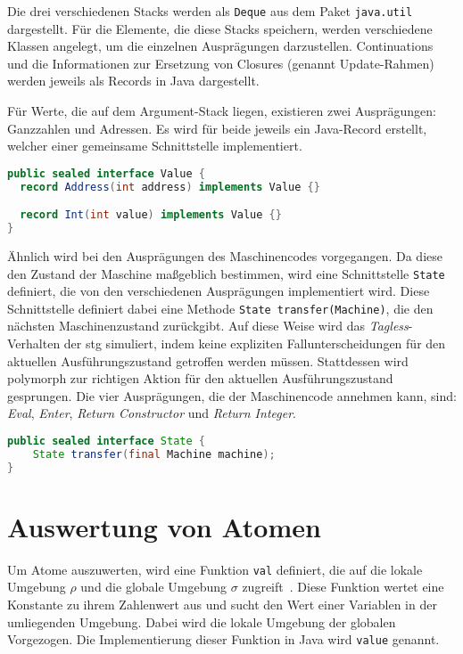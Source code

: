 Die drei verschiedenen Stacks werden als \texttt{Deque} aus dem Paket \texttt{java.util} dargestellt.
Für die Elemente, die diese Stacks speichern, werden verschiedene Klassen angelegt, um die einzelnen Ausprägungen darzustellen.
Continuations und die Informationen zur Ersetzung von Closures (genannt Update-Rahmen) werden jeweils als Records in Java dargestellt.

Für Werte, die auf dem Argument-Stack liegen, existieren zwei Ausprägungen: Ganzzahlen und Adressen.
Es wird für beide jeweils ein Java-Record erstellt, welcher einer gemeinsame Schnittstelle implementiert.

\begin{lstlisting}[language=java, morekeywords={record, sealed}, caption={Darstellung von Werten in Java}, label={lst:value}]
public sealed interface Value {
  record Address(int address) implements Value {}

  record Int(int value) implements Value {}
}
\end{lstlisting}

Ähnlich wird bei den Ausprägungen des Maschinencodes vorgegangen.
Da diese den Zustand der Maschine maßgeblich bestimmen, wird eine Schnittstelle \texttt{State} definiert, die von den verschiedenen Ausprägungen implementiert wird.
Diese Schnittstelle definiert dabei eine Methode \texttt{State transfer(Machine)}, die den nächsten Maschinenzustand zurückgibt.
Auf diese Weise wird das \textit{Tagless}-Verhalten der \gls{stg} simuliert, indem keine expliziten Fallunterscheidungen für den aktuellen Ausführungszustand getroffen werden müssen.
Stattdessen wird polymorph zur richtigen Aktion für den aktuellen Ausführungszustand gesprungen.
Die vier Ausprägungen, die der Maschinencode annehmen kann, sind: \textit{Eval}, \textit{Enter}, \textit{Return Constructor} und \textit{Return Integer}.


\begin{lstlisting}[language=java, morekeywords={record, sealed}, caption={Schnittstelle für die Ausprägungen des Maschinencodes}, label={lst:code}]
public sealed interface State {
    State transfer(final Machine machine);
}
\end{lstlisting}


\section{Auswertung von Atomen}

Um Atome auszuwerten, wird eine Funktion \texttt{val} definiert, die auf die lokale Umgebung $\rho$ und die globale Umgebung $\sigma$ zugreift~\cite{Jones_StockHardwareSTG}.
Diese Funktion wertet eine Konstante zu ihrem Zahlenwert aus und sucht den Wert einer Variablen in der umliegenden Umgebung.
Dabei wird die lokale Umgebung der globalen Vorgezogen.
Die Implementierung dieser Funktion in Java wird \texttt{value} genannt.

